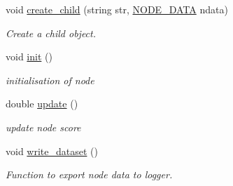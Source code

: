 \begin{DoxyCompactItemize}
void \hyperlink{classMCT__NODE2_ab7b3824130219c1afdfd8d8358e52d76}{create\+\_\+child} (string str, \hyperlink{structNODE__DATA}{N\+O\+D\+E\+\_\+\+D\+A\+TA} ndata)
\begin{DoxyCompactList}\small\item\em Create a child object. \end{DoxyCompactList}\item 
\mbox{\label{classMCT__NODE2_a50143d6d92d93c4ede150b6b10c7dcab}} 
void \hyperlink{classMCT__NODE2_a50143d6d92d93c4ede150b6b10c7dcab}{init} ()
\begin{DoxyCompactList}\small\item\em initialisation of node \end{DoxyCompactList}\item 
double \hyperlink{classMCT__NODE2_a02b11b2ef3bc916dc8bb7fec7f475ca7}{update} ()
\begin{DoxyCompactList}\small\item\em update node score \end{DoxyCompactList}\item 
\mbox{\label{classMCT__NODE2_a519001f81d9ed6e03cbd026d8c94bafa}} 
void \hyperlink{classMCT__NODE2_a519001f81d9ed6e03cbd026d8c94bafa}{write\+\_\+dataset} ()
\begin{DoxyCompactList}\small\item\em Function to export node data to logger. \end{DoxyCompactList}\end{DoxyCompactItemize}

